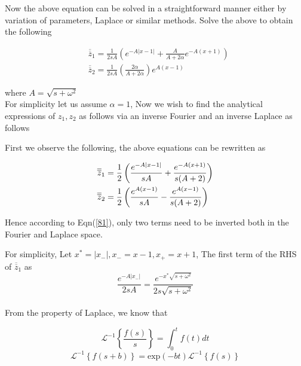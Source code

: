 \documentclass[10pt,a4,fleqn]{article}
\newcommand*{\rttensor}[1]{\overline{\overline{#1}}}
\begin{document}
Now the above equation can be solved in a straightforward manner either by variation of parameters, Laplace or similar methods. Solve the above to obtain the following

\begin{equation}
    \begin{aligned}
    &\rttensor{z}_1 = \frac{1}{2sA}\left( e^{-A\lvert x-1 \rvert } + \frac{A}{A + 2\alpha}e^{-A\left(x+1\right)}\right)\\
    & \rttensor{z}_2 = \frac{1}{2sA}\left(\frac{2\alpha}{A+2\alpha}\right)e^{A(x-1)}
    \end{aligned}
\end{equation}

where $A = \sqrt{s + \omega^2}$\\
For simplicity let us assume $\alpha = 1$, Now we wish to find the analytical expressions of $z_1, z_2$ as follows via an inverse Fourier and an inverse Laplace as follows

First we observe the following, the above equations can be rewritten as 

\begin{equation}{\label{81}}
    \begin{aligned}
    &\rttensor{z}_1 = \frac{1}{2}\left( \frac{e^{-A\lvert x-1 \rvert }}{sA} + \frac{e^{-A\left(x+1\right)}}{s(A + 2)}\right)\\
    & \rttensor{z}_2 = \frac{1}{2}\left(\frac{e^{A(x-1)}}{sA} - \frac{e^{A(x-1)}}{s(A+2)}\right)
    \end{aligned}    
\end{equation}

Hence according to Eqn(\ref{81}), only two terms need to be inverted both in the Fourier and Laplace space. 

For simplicity, Let $x^* = |x_-|, x_-  = x- 1, x_+ = x+ 1$, 
The first term of the RHS of $\rttensor {z}_1$ as 
\[\frac{e^{-A\left|x_-\right|}}{2sA} = \frac{e^{-x^*\sqrt{s+\omega^2}}}{2s\sqrt{s + \omega^2}} \] \\

From the property of Laplace, we know that

\begin{equation}\label{laplace1}
\mathscr{L}^{-1} \left\{\frac{f(s)}{s}\right\} = \int_0^t f(t)dt
\end{equation}
\begin{equation}\label{laplace2}
    \mathscr{L}^{-1} \left\{f(s+b)\right\} = \mathrm{exp}{\left(-bt\right)}\mathscr{L}^{-1}\left\{ f(s) \right\}
\end{equation}
\end{document}
